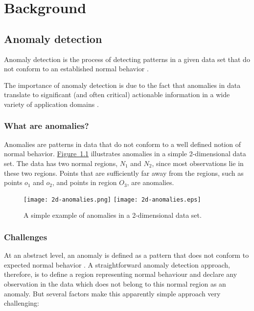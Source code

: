 \chapter{Background}
\label{ch:background}

\section{Anomaly detection}
\label{sec:anomalyDetection}
Anomaly detection is the process of detecting patterns in a given data set that 
do not conform to an established normal behavior \cite{Chandola:2007}.

The importance of anomaly detection is due to the fact that anomalies in data
translate to significant (and often critical) actionable information in a wide 
variety of application domains \cite{Chandola:2007}.

\subsection{What are anomalies?}
\label{sec:whatAreAnomalies}
Anomalies are patterns in data that do not conform to a well defined notion of
normal behavior. \hyperref[fig:2d-anomalies]{Figure~\ref{fig:2d-anomalies}} 
illustrates anomalies in a simple 2-dimensional data set. The data has two 
normal regions, $N_{1}$ and $N_{2}$, since most observations lie in these two 
regions. Points that are sufficiently far away from the regions, such as points 
$o_{1}$ and $o_{2}$, and points in region $O_{3}$, are anomalies.

\begin{figure}
\centering
\ifpdf
	\texttt{[image: 2d-anomalies.png]}
\else
	\texttt{[image: 2d-anomalies.eps]}
\fi
\caption{A simple example of anomalies in a 2-dimensional data set.}
\label{fig:2d-anomalies}
\end{figure}

\subsection{Challenges}
\label{sec:anomalyDetection:challenges}
At an abstract level, an anomaly is defined as a pattern that does not conform 
to expected normal behavior \cite{Chandola:2007}. A straightforward anomaly 
detection approach, therefore, is to define a region representing normal 
behaviour and declare any observation in the data which does not belong to this 
normal region as an anomaly. But several factors make this apparently simple 
approach very challenging:

